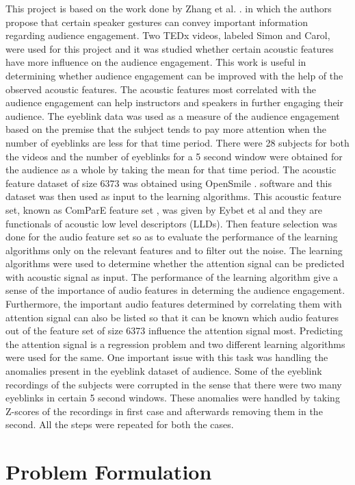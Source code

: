 This project is based on the work done by Zhang et al. \cite{political}. in which the authors propose that certain speaker gestures can convey important information regarding audience engagement. Two TEDx videos, labeled Simon and Carol, were used for this project and it was studied whether certain acoustic features have more influence on the audience engagement. This work is useful in determining whether audience engagement can be improved with the help of the observed acoustic features. The acoustic features most correlated with the audience engagement can help instructors and speakers in further engaging their audience. The eyeblink data was used as a measure of the audience engagement based on the premise that the subject tends to pay more attention when the number of eyeblinks are less for that time period. There were 28 subjects for both the videos and the number of eyeblinks for a 5 second window were obtained for the audience as a whole by taking the mean for that time period. The acoustic feature dataset of size 6373 was obtained using OpenSmile \cite{opensmile}. software and this dataset was then used as input to the learning algorithms. This acoustic feature set, known as ComParE feature set \cite{compare}, was given by Eybet et al \cite{audio} and they are functionals of acoustic low level descriptors (LLDs). Then feature selection was done for the audio feature set so as to evaluate the performance of the learning algorithms only on the relevant features and to filter out the noise. The learning algorithms were used to determine whether the attention signal can be predicted with acoustic signal as input. The performance of the learning algorithm give a sense of the importance of audio features in determing the audience engagement. Furthermore, the important audio features determined by correlating them with attention signal can also be listed so that it can be known which audio features out of the feature set of size 6373 influence the attention signal most. Predicting the attention signal is a regression problem and two different learning algorithms were used for the same. One important issue with this task was handling the anomalies present in the eyeblink dataset of audience. Some of the eyeblink recordings of the subjects were corrupted in the sense that there were two many eyeblinks in certain 5 second windows. These anomalies were handled by taking Z-scores of the recordings in first case and afterwards removing them in the second. All the steps were repeated for both the cases.

\section{Problem Formulation}

